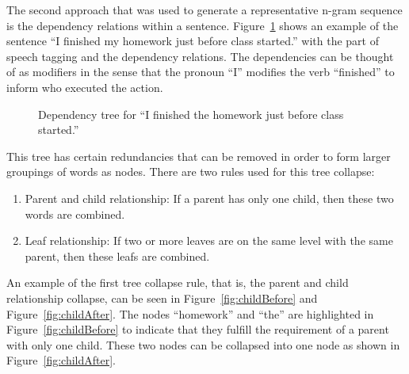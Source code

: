 \documentclass{article}[10]
\begin{document}
The second approach that was used to generate a representative n-gram sequence is the dependency relations within a sentence. Figure~\ref{fig:dep} shows an example of the sentence ``I finished my homework just before class started.'' with the part of speech tagging and the dependency relations. The dependencies can be thought of as modifiers in the sense that the pronoun ``I'' modifies the verb ``finished'' to inform who executed the action.

\begin{figure}[H]
  \begin{center}
    \caption{Dependency tree for ``I finished the homework just before class
      started.''\label{fig:dep}}
  \end{center}
\end{figure}

This tree has certain redundancies that can be removed in order to form larger groupings of words as nodes. There are two rules used for this tree collapse:

\begin{enumerate}[label= (\arabic*)]
    \itemsep0em
    \item{Parent and child relationship: If a parent has only one child, then these two words are combined.}
    \item{Leaf relationship: If two or more leaves are on the same level with
    the same parent, then these leafs are combined.}
\end{enumerate}

An example of the first tree collapse rule, that is, the parent and child relationship collapse, can be seen in Figure~\ref{fig:childBefore} and Figure~\ref{fig:childAfter}. The nodes ``homework'' and ``the'' are highlighted in Figure~\ref{fig:childBefore} to indicate that they fulfill the requirement of a parent with only one child. These two nodes can be collapsed into one node as shown in Figure~\ref{fig:childAfter}.
\end{document}
